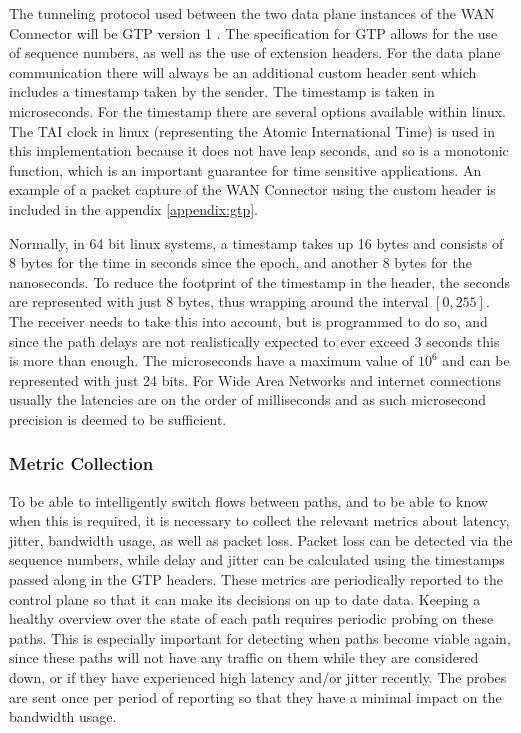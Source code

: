 The tunneling protocol used between the two data plane instances of the WAN Connector will  be GTP version 1 \cite{GTP-spec}. The specification for GTP allows for the use of sequence numbers, as well as the use of extension headers. For the data plane communication there will always be an additional custom header sent which includes a timestamp taken by the sender. The timestamp is taken in microseconds. For the timestamp there are several options available within linux. The TAI clock in linux (representing the Atomic International Time) is used in this implementation because it does not have leap seconds, and so is a monotonic function, which is an important guarantee for time sensitive applications. An example of a packet capture of the WAN Connector using the custom header is included in the appendix \ref{appendix:gtp}.

Normally, in 64 bit linux systems, a timestamp takes up 16 bytes and consists of 8 bytes for the time in seconds since the epoch, and another 8 bytes for the nanoseconds. To reduce the footprint of the timestamp in the header, the seconds are represented with just 8 bytes, thus wrapping around the interval $[0,255]$. The receiver needs to take this into account, but is programmed to do so, and since the path delays are not realistically expected to ever exceed 3 seconds this is more than enough. The microseconds have a maximum value of $10^6$ and can be represented with just 24 bits. For Wide Area Networks and internet connections usually the latencies are on the order of milliseconds and as such microsecond precision is deemed to be sufficient.

\subsubsection{Metric Collection}

To be able to intelligently switch flows between paths, and to be able to know when this is required, it is necessary to collect the relevant metrics about latency, jitter, bandwidth usage, as well as packet loss. Packet loss can be detected via the sequence numbers, while delay and jitter can be calculated using the timestamps passed along in the GTP headers. These metrics are periodically reported to the control plane so that it can make its decisions on up to date data. Keeping a healthy overview over the state of each path requires periodic probing on these paths. This is especially important for detecting when paths become viable again, since these paths will not have any traffic on them while they are considered down, or if they have experienced high latency and/or jitter recently. The probes are sent once per period of reporting so that they have a minimal impact on the bandwidth usage.

